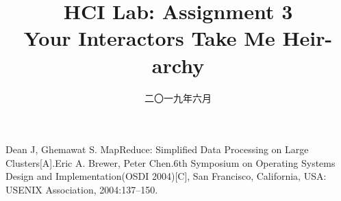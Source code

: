 \documentclass[forprint]{WHUBachelor}
\begin{document}


\title{HCI Lab:	Assignment 3\\Your Interactors Take Me Heir-archy} %
\author{} %
\date{二〇一九年六月} %


\maketitle
\frontmatter
{}              %




\tableofcontents
\thispagestyle{empty}




\mainmatter %
\pagestyle{plain}%
\baselineskip=23pt  %





\cleardoublepage{}
{}
\renewcommand{\baselinestretch}{1.6}
\begin{thebibliography}{00}

 Dean J, Ghemawat S. MapReduce: Simplified Data Processing on Large Clusters[A].Eric A. Brewer, Peter Chen.6th Symposium on Operating Systems Design and Implementation(OSDI 2004)[C], San Francisco, California, USA: {USENIX} Association, 2004:137--150.

\end{thebibliography}
\end{document}
